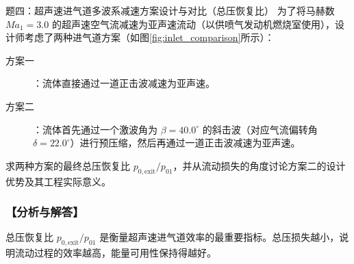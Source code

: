 \documentclass[11pt,a4paper]{ctexart}
\begin{document}
\newpage

\begin{questionbox}{题四：超声速进气道多波系减速方案设计与对比（总压恢复比）}
为了将马赫数 $Ma_1 = 3.0$ 的超声速空气流减速为亚声速流动（以供喷气发动机燃烧室使用），设计师考虑了两种进气道方案（如图\ref{fig:inlet_comparison}所示）：
\begin{description}
    \item[方案一]：流体直接通过一道正击波减速为亚声速。
    \item[方案二]：流体首先通过一个激波角为 $\beta = 40.0^\circ$ 的斜击波（对应气流偏转角 $\delta = 22.0^\circ$）进行预压缩，然后再通过一道正击波减速为亚声速。
\end{description}
求两种方案的最终总压恢复比 $p_{0,\text{exit}}/p_{01}$，并从流动损失的角度讨论方案二的设计优势及其工程实际意义。
\end{questionbox}

\subsubsection*{【分析与解答】}
总压恢复比 $p_{0,\text{exit}}/p_{01}$ 是衡量超声速进气道效率的最重要指标。总压损失越小，说明流动过程的效率越高，能量可用性保持得越好。
\end{document}

